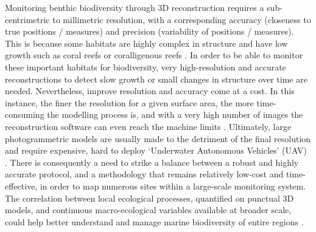 Monitoring benthic biodiversity through 3D reconstruction requires a sub-centrimetric to millimetric resolution, with a corresponding accuracy (closeness to true positions / measures) and precision (variability of positions / measures). This is because some habitats are highly complex in structure and have low growth such as coral reefs \citep{pratchett_spatial_2015} or coralligenous reefs \citep{ballesteros_mediterranean_2006, garrabou_growth_2000, sartoretto_structure_1994}. In order to be able to monitor these important habitats for biodiversity, very high-resolution and accurate reconstructions to detect slow growth or small changes in structure over time are needed. Nevertheless, improve resolution and accuracy come at a cost. In this instance, the finer the resolution for a given surface area, the more time-consuming the modelling process is, and with a very high number of images the reconstruction software can even reach the machine limits \citep{agisoft_agisoft_2018-1}. Ultimately, large photogrammetric models are usually made to the detriment of the final resolution and require expensive, hard to deploy ‘Underwater Autonomous Vehicles’ (UAV) \citep{johnson-roberson_generation_2010}. There is consequently a need to strike a balance between a robust and highly accurate protocol, and a methodology that remains relatively low-cost and time-effective, in order to map numerous sites within a large-scale monitoring system. The correlation between local ecological processes, quantified on punctual 3D models, and continuous macro-ecological variables available at broader scale, could help better understand and manage marine biodiversity of entire regions \citep{gonzalez-rivero_scaling_2016}.
